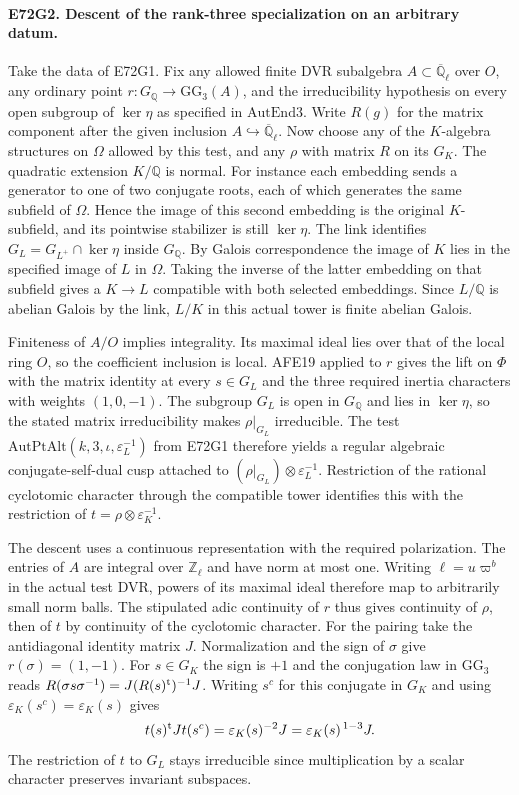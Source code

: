 \paragraph{E72G2. Descent of the rank-three specialization on an arbitrary datum.}
Take the data of E72G1. Fix any allowed finite DVR subalgebra
$A\subset\overline{\mathbb Q}_\ell$ over $O$, any ordinary point
$r:G_{\mathbb Q}\to\mathrm{GG}_3(A)$, and the irreducibility
hypothesis on every open subgroup of $\ker\eta$ as specified in
$\mathrm{AutEnd3}$. Write $R(g)$ for the matrix component after
the given inclusion $A\hookrightarrow\overline{\mathbb Q}_\ell$.
Now choose any of the $K$-algebra structures on $\Omega$ allowed
by this test, and any $\rho$ with matrix $R$ on its $G_K$.
The quadratic extension $K/\mathbb Q$ is normal. For instance
each embedding sends a generator to one of two conjugate roots,
each of which generates the same subfield of $\Omega$. Hence
the image of this second embedding is the original $K$-subfield,
and its pointwise stabilizer is still $\ker\eta$.
The link identifies $G_L=G_{L^+}\cap\ker\eta$ inside
$G_{\mathbb Q}$. By Galois correspondence the image of $K$ lies
in the specified image of $L$ in $\Omega$. Taking the inverse
of the latter embedding on that subfield gives a $K\to L$
compatible with both selected embeddings. Since $L/\mathbb Q$
is abelian Galois by the link, $L/K$ in this actual tower is
finite abelian Galois.

Finiteness of $A/O$ implies integrality. Its maximal ideal lies
over that of the local ring $O$, so the coefficient inclusion is
local. AFE19 applied to $r$ gives the lift on $\Phi$ with the
matrix identity at every $s\in G_L$ and the three required inertia
characters with weights $(1,0,-1)$. The subgroup $G_L$ is open
in $G_{\mathbb Q}$ and lies in $\ker\eta$, so the stated matrix
irreducibility makes $\rho|_{G_L}$ irreducible. The test
$\mathrm{AutPtAlt}(k,3,\iota,\varepsilon_L^{-1})$ from E72G1
therefore yields a regular algebraic conjugate-self-dual cusp
attached to $(\rho|_{G_L})\otimes\varepsilon_L^{-1}$. Restriction
of the rational cyclotomic character through the compatible
tower identifies this with the restriction of
$t=\rho\otimes\varepsilon_K^{-1}$.

The descent uses a continuous representation with the required
polarization. The entries of $A$ are integral over $\mathbb Z_\ell$
and have norm at most one. Writing $\ell=u\varpi^b$ in the actual
test DVR, powers of its maximal ideal therefore map to arbitrarily
small norm balls. The stipulated adic continuity of $r$ thus gives
continuity of $\rho$, then of $t$ by continuity of the cyclotomic
character. For the pairing take the antidiagonal identity matrix $J$.
Normalization and the sign of $\sigma$ give $r(\sigma)=(1,-1)$.
For $s\in G_K$ the sign is $+1$ and the conjugation law in
$\mathrm{GG}_3$ reads
$R(\sigma s\sigma^{-1})=J(R(s)^{\rm t})^{-1}J$.
Writing $s^c$ for this conjugate in $G_K$ and using
$\varepsilon_K(s^c)=\varepsilon_K(s)$ gives
\[
 t(s)^{\rm t}Jt(s^c)
   =\varepsilon_K(s)^{-2}J
   =\varepsilon_K(s)^{\,1-3}J .
\]
The restriction of $t$ to $G_L$ stays irreducible since multiplication
by a scalar character preserves invariant subspaces.


